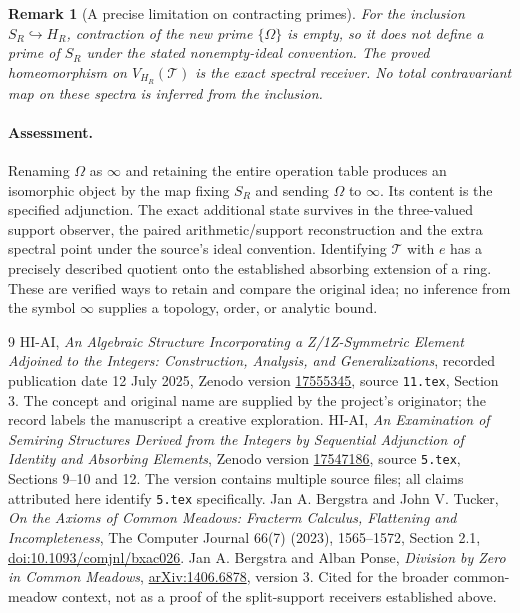 \documentclass[11pt]{article}
\newtheorem{remark}[theorem]{Remark}
\begin{document}
\begin{remark}[A precise limitation on contracting primes]
For the inclusion $S_R\hookrightarrow H_R$, contraction of the new prime $\{\Omega\}$ is empty, so it does not define a prime of $S_R$ under the stated nonempty-ideal convention. The proved homeomorphism on $V_{H_R}(\mathcal T)$ is the exact spectral receiver. No total contravariant map on these spectra is inferred from the inclusion.
\end{remark}

\paragraph{Assessment.}
Renaming $\Omega$ as $\infty$ and retaining the entire operation table produces an isomorphic object by the map fixing $S_R$ and sending $\Omega$ to $\infty$. Its content is the specified adjunction. The exact additional state survives in the three-valued support observer, the paired arithmetic/support reconstruction and the extra spectral point under the source's ideal convention. Identifying $\mathcal T$ with $e$ has a precisely described quotient onto the established absorbing extension of a ring. These are verified ways to retain and compare the original idea; no inference from the symbol $\infty$ supplies a topology, order, or analytic bound.

\begin{thebibliography}{9}
 HI-AI, \emph{An Algebraic Structure Incorporating a Z/1Z-Symmetric Element Adjoined to the Integers: Construction, Analysis, and Generalizations}, recorded publication date 12 July 2025, Zenodo version \href{https://zenodo.org/records/17555345}{17555345}, source \texttt{11.tex}, Section 3. The concept and original name are supplied by the project's originator; the record labels the manuscript a creative exploration.
 HI-AI, \emph{An Examination of Semiring Structures Derived from the Integers by Sequential Adjunction of Identity and Absorbing Elements}, Zenodo version \href{https://zenodo.org/records/17547186}{17547186}, source \texttt{5.tex}, Sections 9--10 and 12. The version contains multiple source files; all claims attributed here identify \texttt{5.tex} specifically.
 Jan A. Bergstra and John V. Tucker, \emph{On the Axioms of Common Meadows: Fracterm Calculus, Flattening and Incompleteness}, The Computer Journal 66(7) (2023), 1565--1572, Section 2.1, \href{https://doi.org/10.1093/comjnl/bxac026}{doi:10.1093/comjnl/bxac026}.
 Jan A. Bergstra and Alban Ponse, \emph{Division by Zero in Common Meadows}, \href{https://arxiv.org/abs/1406.6878}{arXiv:1406.6878}, version 3. Cited for the broader common-meadow context, not as a proof of the split-support receivers established above.
\end{thebibliography}
\end{document}
